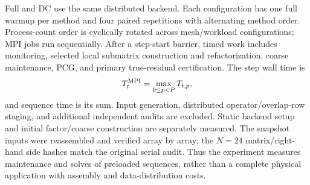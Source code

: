 \documentclass[preprint,12pt,3p]{elsarticle}
\begin{document}
Full and DC use the same distributed backend. Each configuration has one full
warmup per method and four paired repetitions with alternating method order.
Process-count order is cyclically rotated across mesh/workload configurations;
MPI jobs run sequentially. After a step-start barrier, timed work includes
monitoring, selected local submatrix construction and refactorization, coarse
maintenance, PCG, and primary true-residual certification. The step wall time is
\begin{equation}
T_t^{\rm MPI}=\max_{0\le p<P}T_{t,p},
\label{eq:dc_mpi_walltime}
\end{equation}
and sequence time is its sum. Input generation, distributed operator/overlap-row
staging, and additional independent audits are excluded. Static backend setup
and initial factor/coarse construction are separately measured. The snapshot
inputs were reassembled and verified array by array; the $N=24$ matrix/right-hand
side hashes match the original serial audit. Thus the experiment measures
maintenance and solves of preloaded sequences, rather than a complete physical
application with assembly and data-distribution costs.
\end{document}
